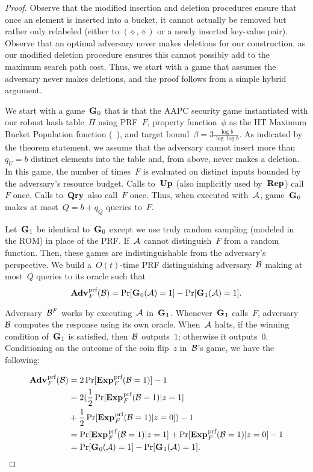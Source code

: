 \begin{proof}
    Observe that the modified insertion and deletion procedures ensure that once an element is inserted into a bucket, it cannot actually be removed but rather only relabeled (either to $(\diamond,\diamond)$ or a newly inserted key-value pair). Observe that an optimal adversary never makes deletions for our construction, as our modified deletion procedure ensures this cannot possibly add to the maximum search path cost. Thus, we start with a game that assumes the adversary never makes deletions, and the proof follows from a simple hybrid argument.
    
    We start with a game~$\textup{\textbf{G}}\hspace{0.5pt}_0$ that is that the AAPC security game instantiated with our robust hash table~$\Pi$ using PRF~$F$, property function~$\phi$ as the HT Maximum Bucket Population function (~), and target bound~$\beta = 3 \frac{\log b}{\log \log b}$. As indicated by the theorem statement, we assume that the adversary cannot insert more than~$q_U = b$ distinct elements into the table and, from above, never makes a deletion. In this game, the number of times~$F$ is evaluated on distinct inputs bounded by the adversary's resource budget. Calls to~$\textup{\textbf{Up}}\hspace{0.5pt}$ (also implicitly used by~$\textup{\textbf{Rep}}\hspace{0.5pt}$) call~$F$ once. Calls to~$\textup{\textbf{Qry}}\hspace{0.5pt}$ also call~$F$ once. Thus, when executed with~$\mathcal{A}$, game~$\textup{\textbf{G}}\hspace{0.5pt}_0$ makes at most~$Q = b + q_Q$ queries to~$F$.
    
    Let~$\textup{\textbf{G}}\hspace{0.5pt}_1$ be identical to~$\textup{\textbf{G}}\hspace{0.5pt}_0$ except we use truly random sampling (modeled in the ROM) in place of the PRF. If~$\mathcal{A}$ cannot distinguish~$F$ from a random function. Then, these games are indistinguishable from the adversary's perspective. We build a~$O(t)$-time PRF distinguishing adversary~$\mathcal{B}$ making at most~$Q$ queries to its oracle such that
    \begin{equation}
        \Adv{\text{prf}}_{F}(\advB) = \Pr[\game_0(\advA) = 1] - \Pr[\game_1(\advA) = 1].
    \end{equation}
    
    Adversary~$\mathcal{B}^{F}$ works by executing~$\mathcal{A}$ in~$\textup{\textbf{G}}\hspace{0.5pt}_1$. Whenever~$\textup{\textbf{G}}\hspace{0.5pt}_1$ calls~$F$, adversary~$\mathcal{B}$ computes the response using its own oracle. When~$\mathcal{A}$ halts, if the winning condition of~$\textup{\textbf{G}}\hspace{0.5pt}_1$ is satisfied, then~$\mathcal{B}$ outputs~$1$; otherwise it outputs~$0$. Conditioning on the outcome of the coin flip~$z$ in~$\mathcal{B}$'s game, we have the following: 
    
    \begin{align*}
        \Adv{\text{prf}}_{F}(\advB) &= 2\Pr[\Exp{\text{prf}}_{F}(\advB = 1)] -1\\
        &= 2(\frac{1}{2}\Pr[\Exp{\text{prf}}_{F}(\advB = 1) | z =1]   \\  &+ \frac{1}{2}\Pr[\Exp{\text{prf}}_{F}(\advB = 1) | z =0])-1\\
        &= \Pr[\Exp{\text{prf}}_{F}(\advB = 1) | z =1]  + \Pr[\Exp{\text{prf}}_{F}(\advB = 1) | z =0]-1\\
        &= \Pr[\game_0(\advA) = 1] - \Pr[\game_1(\advA) = 1].
    \end{align*}
    

\end{proof}
